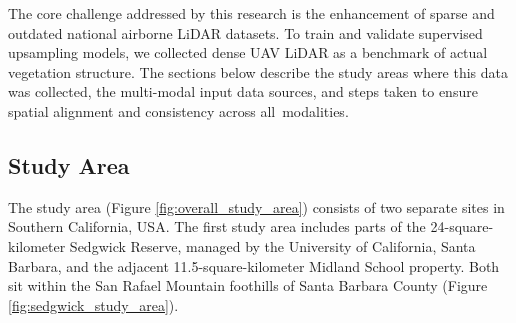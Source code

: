 \documentclass[remotesensing,article,accept,pdftex,moreauthors]{Definitions/mdpi}
\begin{document}

The core challenge addressed by this research is the enhancement of sparse and outdated national airborne LiDAR datasets. To train and validate supervised upsampling models, we collected dense UAV LiDAR as a benchmark of actual vegetation structure. The sections below describe the study areas where this data was collected, the multi-modal input data sources, and steps taken to ensure spatial alignment and consistency across \mbox{all modalities}.


\subsection{Study Area}


The study area (Figure \ref{fig:overall_study_area}) consists of two separate sites in Southern California, USA. The first study area includes parts of the 24-square-kilometer Sedgwick Reserve, managed by the University of California, Santa Barbara, and the adjacent 11.5-square-kilometer Midland School property. Both sit within the San Rafael Mountain foothills of Santa Barbara County (Figure \ref{fig:sedgwick_study_area}).
\end{document}
